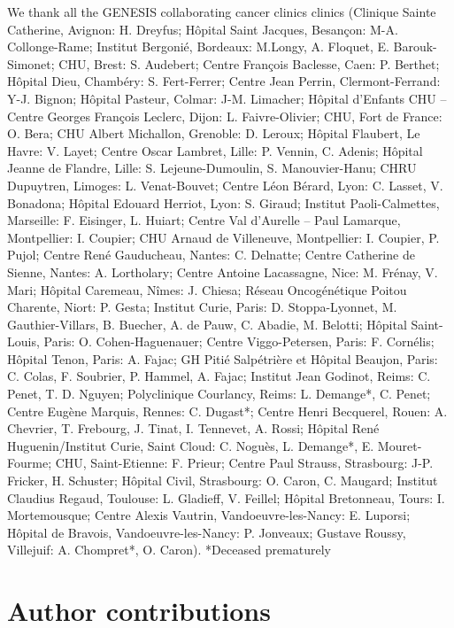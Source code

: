 \documentclass[10pt,letterpaper]{article}
\begin{document}
We thank all the GENESIS collaborating cancer clinics clinics (Clinique Sainte Catherine, Avignon: H. Dreyfus; Hôpital Saint Jacques, Besançon: M-A. Collonge-Rame; Institut Bergonié, Bordeaux: M.Longy, A. Floquet, E. Barouk-Simonet; CHU, Brest: S. Audebert; Centre François Baclesse, Caen: P. Berthet; Hôpital Dieu, Chambéry: S. Fert-Ferrer; Centre Jean Perrin, Clermont-Ferrand: Y-J. Bignon; Hôpital Pasteur, Colmar: J-M. Limacher; Hôpital d’Enfants CHU – Centre Georges François Leclerc, Dijon: L. Faivre-Olivier; CHU, Fort de France: O. Bera; CHU Albert Michallon, Grenoble: D. Leroux; Hôpital Flaubert, Le Havre: V. Layet; Centre Oscar Lambret, Lille: P. Vennin, C. Adenis; Hôpital Jeanne de Flandre, Lille: S. Lejeune-Dumoulin, S. Manouvier-Hanu; CHRU Dupuytren, Limoges: L. Venat-Bouvet; Centre Léon Bérard, Lyon: C. Lasset, V. Bonadona; Hôpital Edouard Herriot, Lyon: S. Giraud; Institut Paoli-Calmettes, Marseille: F. Eisinger, L. Huiart; Centre Val d’Aurelle – Paul Lamarque, Montpellier: I. Coupier; CHU Arnaud de Villeneuve, Montpellier: I. Coupier, P. Pujol; Centre René Gauducheau, Nantes: C. Delnatte; Centre Catherine de Sienne, Nantes: A. Lortholary; Centre Antoine Lacassagne, Nice: M. Frénay, V. Mari; Hôpital Caremeau, Nîmes: J. Chiesa; Réseau Oncogénétique Poitou Charente, Niort: P. Gesta; Institut Curie, Paris: D. Stoppa-Lyonnet, M. Gauthier-Villars, B. Buecher, A. de Pauw, C. Abadie, M. Belotti; Hôpital Saint-Louis, Paris: O. Cohen-Haguenauer; Centre Viggo-Petersen, Paris: F. Cornélis; Hôpital Tenon, Paris: A. Fajac; GH Pitié Salpétrière et Hôpital Beaujon, Paris: C. Colas, F. Soubrier, P. Hammel, A. Fajac; Institut Jean Godinot, Reims: C. Penet, T. D. Nguyen; Polyclinique Courlancy, Reims: L. Demange*, C. Penet; Centre Eugène Marquis, Rennes: C. Dugast*; Centre Henri Becquerel, Rouen: A. Chevrier, T. Frebourg, J. Tinat, I. Tennevet, A. Rossi; Hôpital René Huguenin/Institut Curie, Saint Cloud: C. Noguès, L. Demange*, E. Mouret-Fourme; CHU, Saint-Etienne: F. Prieur; Centre Paul Strauss, Strasbourg: J-P. Fricker, H. Schuster; Hôpital Civil, Strasbourg: O. Caron, C. Maugard; Institut Claudius Regaud, Toulouse: L. Gladieff, V. Feillel; Hôpital Bretonneau, Tours: I. Mortemousque; Centre Alexis Vautrin, Vandoeuvre-les-Nancy: E. Luporsi; Hôpital de Bravois, Vandoeuvre-les-Nancy: P. Jonveaux; Gustave Roussy, Villejuif: A. Chompret*, O. Caron).
*Deceased prematurely

\section*{Author contributions}
\end{document}
